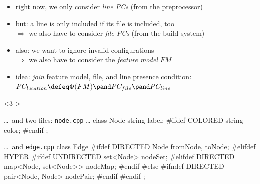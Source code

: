 \begin{frame}[fragile]{\myframetitle}
	\begin{fancycolumns}[widths={67,33},animation=none]
		\begin{note}{}
			\begin{itemize}
				\item right now, we only consider \emph{line PCs} (from the preprocessor)
				\item but: a line is only included if its file is included, too\\
					$\Rightarrow$ we also have to consider \emph{file PCs} (from the build system)
				\item also: we want to ignore invalid configurations\\
					$\Rightarrow$ we also have to consider the \emph{feature model} $FM$
				\item idea: \emph{join} feature model, file, and line presence condition:\\
					$PC_{location} \defeq \Phi(FM) \pand PC_{file} \pand PC_{line}$
			\end{itemize}
		\end{note}
	\nextcolumn
		\begin{uncoverenv}<3->
			\begin{cpptight}[basicstyle=\tiny]{\ldots\ and two files: \texttt{node.cpp} \ldots}
class Node {
	string label;
#ifdef COLORED
	string color;
#endif
};
			\end{cpptight}
			\begin{cpptight}[basicstyle=\tiny]{\ldots\ and \texttt{edge.cpp}}
class Edge {
#ifdef DIRECTED
	Node fromNode, toNode;
#elifdef HYPER
#ifdef UNDIRECTED
	set<Node> nodeSet;
#elifdef DIRECTED
	map<Node, set<Node>> nodeMap;
#endif
#else
#ifndef DIRECTED
	pair<Node, Node> nodePair;
#endif
#endif
};
			\end{cpptight}
		\end{uncoverenv}
	\end{fancycolumns}
\end{frame}

